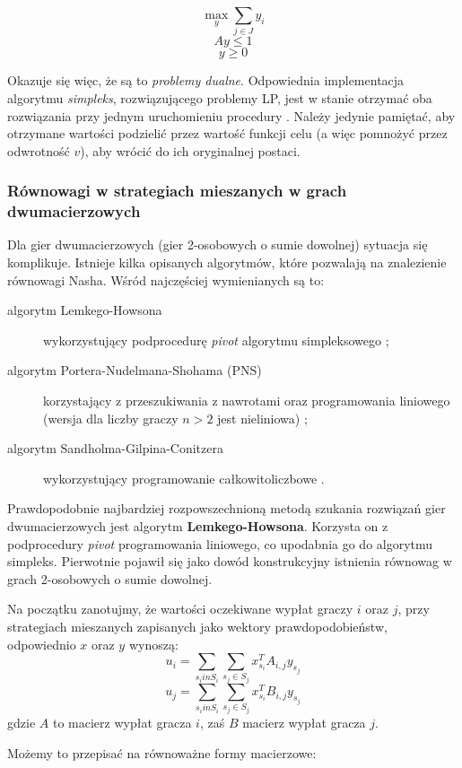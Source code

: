 \documentclass[polish]{standalone}
\begin{document}
$$\max_y \sum_{j \in J} y_i$$
$$Ay \leq 1 $$
$$y \geq 0$$

Okazuje się więc, że są to \textit{problemy dualne}. \cite[str.~42--47]{O-GT} Odpowiednia implementacja algorytmu
\textit{simpleks}, rozwiązującego problemy LP, jest w stanie otrzymać oba rozwiązania przy jednym uruchomieniu
procedury \cite[str.~49--61]{O-GT}. Należy jedynie pamiętać, aby otrzymane wartości podzielić przez wartość funkcji
celu (a więc pomnożyć przez odwrotność $v$), aby wrócić do ich oryginalnej postaci.

\subsubsection{Równowagi w strategiach mieszanych w grach dwumacierzowych}

Dla gier dwumacierzowych (gier 2-osobowych o sumie dowolnej) sytuacja się komplikuje. Istnieje
kilka opisanych algorytmów, które pozwalają na znalezienie równowagi Nasha. Wśród najczęściej wymienianych są to:
\begin{description}
\item[algorytm Lemkego-Howsona] wykorzystujący podprocedurę \textit{pivot} algorytmu simpleksowego \cite{LH-NE};
\item[algorytm Portera-Nudelmana-Shohama (PNS)] korzystający z przeszukiwania z nawrotami oraz programowania liniowego
(wersja dla liczby graczy $n > 2$ jest nieliniowa) \cite{PNS-NE};
\item[algorytm Sandholma-Gilpina-Conitzera] wykorzystujący programowanie całkowitoliczbowe \cite{SCG-NE}.
\end{description}

Prawdopodobnie najbardziej rozpowszechnioną metodą szukania rozwiązań gier dwumacierzowych jest algorytm
\textbf{Lemkego-Howsona}\cite{LH-NE}. Korzysta on z podprocedury \textit{pivot} programowania liniowego, co upodabnia
go do algorytmu simpleks. Pierwotnie pojawił się jako dowód konstrukcyjny istnienia równowag w grach 2-osobowych o sumie
dowolnej.

Na początku zanotujmy, że wartości oczekiwane wypłat graczy $i$ oraz $j$, przy strategiach mieszanych zapisanych jako
wektory prawdopodobieństw, odpowiednio $x$ oraz $y$ wynoszą:
$$u_i = \sum_{s_i in S_i}\sum_{s_j \in S_j} x_{s_i}^{T} A_{i,j} y_{s_j}$$
$$u_j = \sum_{s_i in S_i}\sum_{s_j \in S_j} x_{s_i}^{T} B_{i,j} y_{s_j}$$
gdzie $A$ to macierz wypłat gracza $i$, zaś $B$ macierz wypłat gracza $j$.

Możemy to przepisać na równoważne formy macierzowe:
\end{document}

